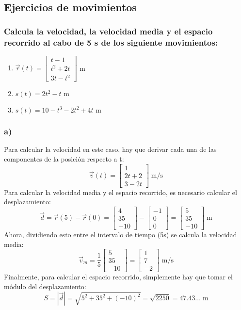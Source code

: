 \documentclass[ %
    oneside,    %
    10pt        %
]{apuntes} %
\begin{document}
\begin{examplebox}
	\subsection*{Ejercicios de movimientos}
	\subsubsection*{Calcula la velocidad, la velocidad media y el espacio recorrido al cabo de 5 s de los siguiente movimientos:}
	\begin{enumerate}[label = \alph*) ]
		\item \(\vec{r}(t) = \left[\begin{array}{c}t - 1 \\ t^2 + 2t \\ 3t - t^2 \end{array}\right]\) m
		\item $s(t) = 2t^2 - t$ m
		\item $s(t) = 10 - t^3 - 2t^2 + 4t$ m
	\end{enumerate}
	\subsubsection*{a)}
	Para calcular la velocidad en este caso, hay que derivar cada una de las componentes de la posición respecto a t:
	\[ \vec{v}(t) = \left[\begin{array}{c} 1 \\ 2t + 2\\ 3 - 2t \end{array}\right] \; \text{m/s}\]
	Para calcular la velocidad media y el espacio recorrido, es necesario calcular el desplazamiento:
	\[\vec{d} = \vec{r}(5) - \vec{r}(0) = \left[\begin{array}{r}4 \\ 35 \\ - 10 \end{array}\right] - \left[\begin{array}{r} - 1 \\ 0 \\ 0 \end{array}\right] = \left[\begin{array}{r}5 \\ 35 \\ - 10 \end{array}\right] \; \text{m}\]
	Ahora, dividiendo esto entre el intervalo de tiempo (5s) se calcula la velocidad media:
	\[\vec{v}_m = \frac1{5}\left[\begin{array}{r}5 \\ 35 \\ - 10 \end{array}\right] = \left[\begin{array}{r}1 \\ 7 \\ - 2 \end{array}\right] \; \text{m/s}\]
	Finalmente, para calcular el espacio recorrido, simplemente hay que tomar el módulo del desplazamiento:
	\[S = |\vec{d}| = \sqrt{5^2 + 35^2 + (-10)^2} = \sqrt{2250} = 47.43\dots \; \text{m}\]

\end{examplebox}
\end{document}
